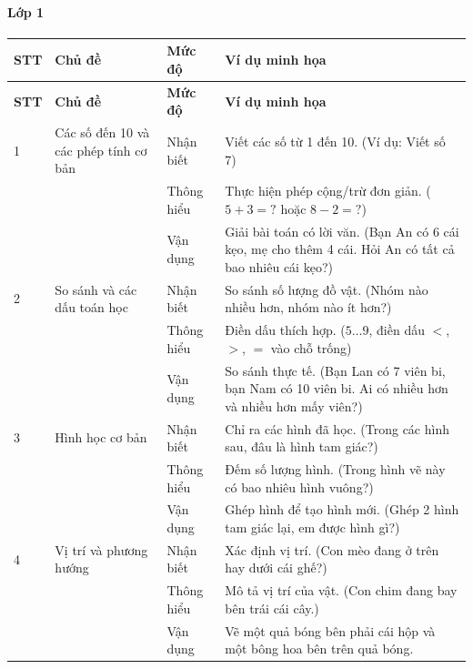 \paragraph{Lớp 1}
\renewcommand{\arraystretch}{1.3}
\begin{longtable}{|>{\centering\arraybackslash}m{0.8cm}|m{3.5cm}|>{\centering\arraybackslash}m{2cm}|m{7.5cm}|}
	\hline
	\textbf{STT} & \textbf{Chủ đề} & \textbf{Mức độ} & \textbf{Ví dụ minh họa} \\
	\hline
	\endfirsthead
	\hline
	\textbf{STT} & \textbf{Chủ đề} & \textbf{Mức độ} & \textbf{Ví dụ minh họa} \\
	\hline
	\endhead
	\hline
	\endfoot

	1 & Các số đến 10 và các phép tính cơ bản
	& Nhận biết & Viết các số từ 1 đến 10. (Ví dụ: Viết số 7) \\
	\cline{3-4}
	& & Thông hiểu & Thực hiện phép cộng/trừ đơn giản. ($5+3=?$ hoặc $8-2=?$) \\
	\cline{3-4}
	& & Vận dụng & Giải bài toán có lời văn. (Bạn An có 6 cái kẹo, mẹ cho thêm 4 cái. Hỏi An có tất cả bao nhiêu cái kẹo?) \\
	\hline

	2 & So sánh và các dấu toán học
	& Nhận biết & So sánh số lượng đồ vật. (Nhóm nào nhiều hơn, nhóm nào ít hơn?) \\
	\cline{3-4}
	& & Thông hiểu & Điền dấu thích hợp. ($5 \ldots 9$, điền dấu $<$, $>$, $=$ vào chỗ trống) \\
	\cline{3-4}
	& & Vận dụng & So sánh thực tế. (Bạn Lan có 7 viên bi, bạn Nam có 10 viên bi. Ai có nhiều hơn và nhiều hơn mấy viên?) \\
	\hline

	3 & Hình học cơ bản
	& Nhận biết & Chỉ ra các hình đã học. (Trong các hình sau, đâu là hình tam giác?) \\
	\cline{3-4}
	& & Thông hiểu & Đếm số lượng hình. (Trong hình vẽ này có bao nhiêu hình vuông?) \\
	\cline{3-4}
	& & Vận dụng & Ghép hình để tạo hình mới. (Ghép 2 hình tam giác lại, em được hình gì?) \\
	\hline

	4 & Vị trí và phương hướng
	& Nhận biết & Xác định vị trí. (Con mèo đang ở trên hay dưới cái ghế?) \\
	\cline{3-4}
	& & Thông hiểu & Mô tả vị trí của vật. (Con chim đang bay bên trái cái cây.) \\
	\cline{3-4}
	& & Vận dụng & Vẽ một quả bóng bên phải cái hộp và một bông hoa bên trên quả bóng. \\
	\hline


\end{longtable}
